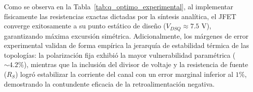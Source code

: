 \documentclass[conference]{IEEEtran}
\begin{document}
Como se observa en la Tabla~\ref{tab:q_optimo_experimental}, al implementar
físicamente las resistencias exactas dictadas por la síntesis analítica, el
JFET converge exitosamente a su punto estático de diseño ($V_{DSQ} \approx
    7.5\text{ V}$), garantizando máxima excursión simétrica. Adicionalmente, los
márgenes de error experimental validan de forma empírica la jerarquía de
estabilidad térmica de las topologías: la polarización fija exhibió la mayor
vulnerabilidad paramétrica ($\sim 4.2\%$), mientras que la inclusión del
divisor de voltaje y la resistencia de fuente ($R_S$) logró estabilizar la
corriente del canal con un error marginal inferior al $1\%$, demostrando la
contundente eficacia de la retroalimentación negativa.

\begin{table}[htbp]
    \caption{Verificación Experimental del Punto de Operación Óptimo con Valores de Diseño Matemático}\label{tab:q_optimo_experimental}
    \centering
\end{table}
\end{document}
